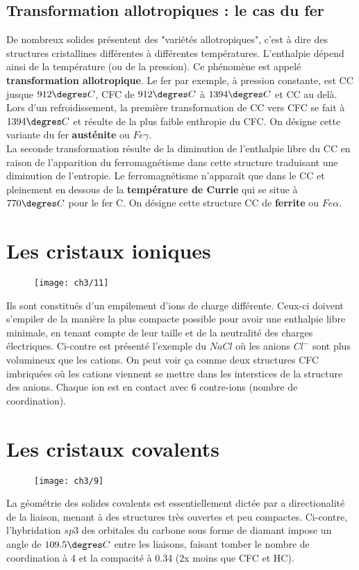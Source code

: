 		\subsection{Transformation allotropiques : le cas du fer}
			De nombreux solides présentent des "variétés allotropiques", c'est à dire des structures cristallines différentes à différentes températures. L'enthalpie dépend ainsi de la température (ou de la pression). Ce phénomène est appelé \textbf{transformation allotropique}. Le fer par exemple, à pression constante, est CC jusque $912\degres C$, CFC de $912\degres C$ à $1394\degres C$ et CC au delà. \\
			Lors d'un refroidissement, la première transformation de CC vers CFC se fait à $1394 \degres C$ et résulte de la plus faible enthropie du CFC. On désigne cette variante du fer \textbf{austénite} ou $Fe\gamma$. \\
			La seconde transformation résulte de la diminution de l'enthalpie libre du CC en raison de l'apparition du ferromagnétisme dans cette structure traduisant une diminution de l'entropie. Le ferromagnétisme n'apparaît que dans le CC et pleinement en dessous de la \textbf{température de Currie} qui se situe à $770\degres C$ pour le fer C. On désigne cette structure CC de \textbf{ferrite} ou $Fe \alpha$.
			
\section{Les cristaux ioniques}
	\begin{wrapfigure}[5]{r}{5.4cm}
	\vspace{-5mm}
	\texttt{[image: ch3/11]}
	\end{wrapfigure}
	Ils sont constitués d'un empilement d'ions de charge différente. Ceux-ci doivent s'empiler de la manière la plus compacte possible pour avoir une enthalpie libre minimale, en tenant compte de leur taille et de la neutralité des charges électriques. Ci-contre est présenté l'exemple du $NaCl$ où les anions $Cl^-$ sont plus volumineux que les cations. On peut voir ça comme deux structures CFC imbriquées où les cations viennent se mettre dans les interstices de la structure des anions. Chaque ion est en contact avec 6 contre-ions (nombre de coordination). 

\section{Les cristaux covalents}
	\begin{wrapfigure}[5]{l}{2.8cm}
	\vspace{-5mm}
	\texttt{[image: ch3/9]}
	\end{wrapfigure}	
	La géométrie des solides covalents est essentiellement dictée par a directionalité de la liaison, menant à des structures très ouvertes et peu compactes. Ci-contre, l'hybridation $sp3$ des orbitales du carbone sous forme de diamant impose un angle de $109.5\degres C$ entre les liaisons, faisant tomber le nombre de coordination à 4 et la compacité à 0.34 (2x moins que CFC et HC).
	
